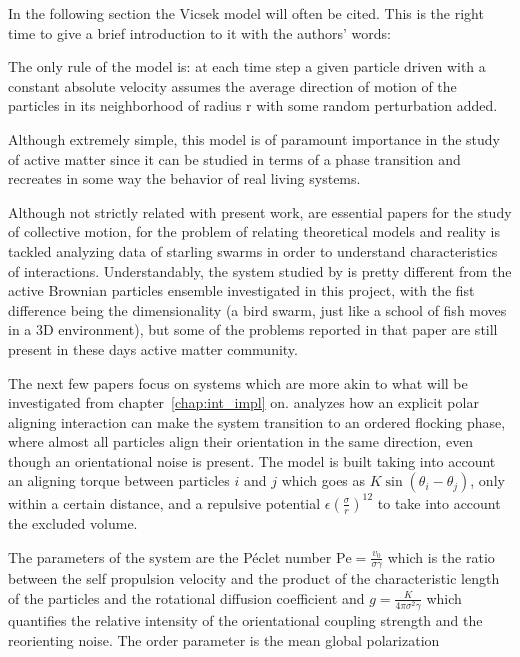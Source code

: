 \documentclass[../../master_thesis_np.tex]{subfiles}
\begin{document}
	In the following section the Vicsek model will often be cited. This is the right time to give a brief introduction to it with the authors' words:
	 \begin{displayquote}
		The only rule of the model is: at each time step a given particle driven with a constant absolute velocity assumes the average direction of motion of the particles in its neighborhood of radius r with some random perturbation added.\cite{vicsek_novel_1995}
	 \end{displayquote}
	 Although extremely simple, this model is of paramount importance in the study of active matter since it can be studied in terms of a phase transition and recreates in some way the behavior of real living systems.
	
	Although not strictly related with present work,\parencite{cavagna_empirical_2010, ballerini_interaction_2008} are essential papers for the study of collective motion, for the problem of relating theoretical models and reality is tackled analyzing data of starling swarms in order to understand characteristics of interactions. Understandably, the system studied by \citeauthor{cavagna_empirical_2010, ballerini_interaction_2008} is pretty different from the active Brownian particles ensemble investigated in this project, with the fist difference being the dimensionality (a bird swarm, just like a school of fish moves in a 3D environment), but some of the problems reported in that paper are still present in these days active matter community.
	
	The next few papers focus on systems which are more akin to what will be investigated from chapter~\ref{chap:int_impl} on. \parencite{martin-gomez_collective_2018} analyzes how an explicit polar aligning interaction can make the system transition to an ordered flocking phase, where almost all particles align their orientation in the same direction, even though an orientational noise is present. The model is built taking into account an aligning torque between particles $i$ and $j$ which goes as $K \sin{(\theta_{i} - \theta_{j})}$, only within a certain distance, and a repulsive potential $\epsilon \left(\frac{\sigma}{r}\right)^{12}$ to take into account the excluded volume.
	
	The parameters of the system are the Péclet number $\mathrm{Pe} = \frac{v_0}{\sigma \gamma}$ which is the ratio between the self propulsion velocity and the product of the characteristic length of the particles and the rotational diffusion coefficient and $g = \frac{K}{4\pi \sigma^2 \gamma}$ which quantifies the relative intensity of the orientational coupling strength and the reorienting noise. The order parameter is the mean global polarization
\end{document}
